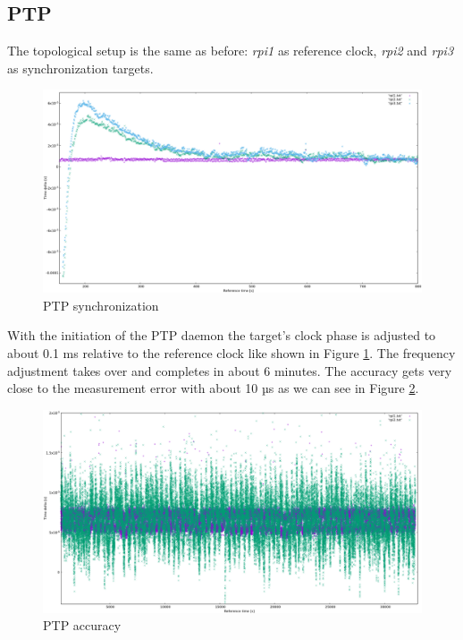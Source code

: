 \subsection{PTP}

The topological setup is the same as before: \textit{rpi1} as reference clock, \textit{rpi2} and \textit{rpi3} as synchronization targets.

\begin{figure}[tb]
	\centering
	\includegraphics[width=1.0\textwidth]{figures/plot_ptp1.png}
	\caption{PTP synchronization}
	\label{fig:plot_ptp1}
\end{figure}

With the initiation of the PTP daemon the target's clock phase is adjusted to about 0.1 ms relative to the reference clock like shown in Figure \ref{fig:plot_ptp1}. The frequency adjustment takes over and completes in about 6 minutes. The accuracy gets very close to the measurement error with about 10 µs as we can see in Figure \ref{fig:plot_ptp2}.

\begin{figure}[tb]
	\centering
	\includegraphics[width=1.0\textwidth]{figures/plot_ptp2.png}
	\caption{PTP accuracy}
	\label{fig:plot_ptp2}
\end{figure}

